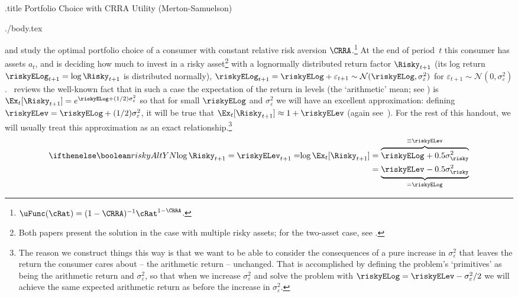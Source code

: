 \documentclass{\handout}
\begin{document}
\begin{verbatimwrite}{\jobname.title}
Portfolio Choice with CRRA Utility (Merton-Samuelson)
\end{verbatimwrite}
\medskip\medskip\medskip

\handoutNameMake
\begin{verbatimwrite}{./body.tex}

\newcommand{\scale}{x}

\newcommand{\riskyshk}{\varepsilon}
\newcommand{\riskyshkvar}{\sigma^{2}_{\riskyshk}}

\cite{merton:restat} and \cite{samuelson:portfolio} study the optimal portfolio choice of a consumer with constant relative risk aversion $\CRRA$.\footnote{$\uFunc(\cRat) = (1-\CRRA)^{-1}\cRat^{1-\CRRA}$.}  At the end of period~$t$ this consumer has assets $a_{t}$, and is deciding how much to invest in a risky asset\footnote{Both papers present the solution in the case with multiple risky assets; for the two-asset case, see .} with a lognormally distributed return factor $\Risky_{t+1}$ (its log return $\riskyELog_{t+1} = \log \Risky_{t+1}$ is distributed normally), $\riskyELog_{t+1} = \riskyELog+\riskyshk_{t+1} \sim \mathcal{N}(\riskyELog,\riskyshkvar)$ for $\riskyshk_{t+1}\sim\mathcal{N}(0,\riskyshkvar)$.  {\ELogNorm}~reviews the well-known fact that in such a case the expectation of the return in levels (the `arithmetic' mean; see \ArithmeticVSGeometric) is $\Ex_{t}[\Risky_{t+1}]=e^{\riskyELog+(1/2)\riskyshkvar}$ so that for small $\riskyELog$ and $\riskyshkvar$ we will have an excellent approximation: defining $\riskyELev=\riskyELog+(1/2)\riskyshkvar$, it will be true that $\Ex_{t}[\Risky_{t+1}] \approx 1 + \riskyELev$ (again see~{\ArithmeticVSGeometric}).  For the rest of this handout, we will usually treat this approximation as an exact relationship.\footnote{The reason we construct things this way is that we want to be able to consider the consequences of a pure increase in $\riskyshkvar$ that leaves the return the consumer cares about -- the arithmetic return -- unchanged.  That is accomplished by defining the problem's `primitives' as being the arithmetic return and $\riskyshkvar$, so that when we increase $\riskyshkvar$ and solve the problem with $\riskyELog = \riskyELev - \riskyshkvar/2$ we will achieve the same expected arithmetic return as before the increase in $\riskyshkvar$.}
\begin{equation}\begin{gathered}\begin{aligned}
    \ifriskyAlt{\log \Risky_{t+1} = \riskyELev_{t+1} = }{\log \Ex_{t}[\Risky_{t+1}]  }       & =  \overbrace{\riskyELog_{}+0.5\sigma^{2}_{\risky}}^{\equiv \riskyELev_{}}
    \\   & =  \underbrace{\riskyELev_{}-0.5\sigma^{2}_{\risky}}_{=\riskyELog_{}}
\end{aligned}\end{gathered}\end{equation}


\end{verbatimwrite}
\end{document}
